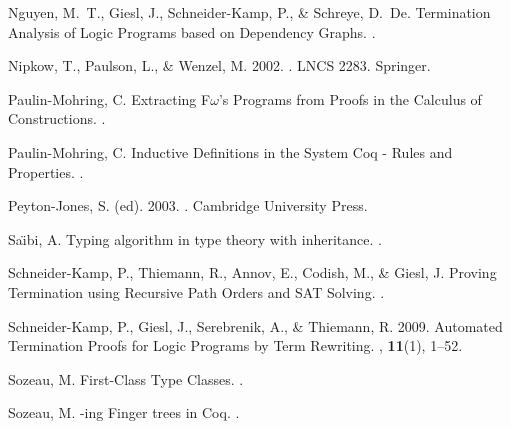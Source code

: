 \begin{thebibliography}{}
Nguyen, M.~T., Giesl, J., Schneider-Kamp, P., \& Schreye, D.~De.
\newblock Termination Analysis of Logic Programs based on Dependency Graphs.
.

Nipkow, T., Paulson, L., \& Wenzel, M. 2002.
.
\newblock LNCS 2283.
\newblock Springer.


Paulin-Mohring, C.
\newblock Extracting {F}$\omega$'s Programs from Proofs in the Calculus of
  Constructions.
.

Paulin-Mohring, C.
\newblock Inductive Definitions in the System {Coq} - Rules and Properties.
.

Peyton-Jones, S. (ed). 2003.
.
\newblock Cambridge University Press.

Sa{\"\i}bi, A.
\newblock Typing algorithm in type theory with inheritance.
.

Schneider-Kamp, P., Thiemann, R., Annov, E., Codish, M., \& Giesl, J.
\newblock Proving Termination using Recursive Path Orders and {SAT} Solving.
.

Schneider-Kamp, P., Giesl, J., Serebrenik, A., \& Thiemann, R. 2009.
\newblock Automated Termination Proofs for Logic Programs by Term Rewriting.
, {\bf 11}(1), 1--52.

Sozeau, M.
\newblock First-Class Type Classes.
.

Sozeau, M.
-ing Finger trees in {Coq}.
.


\end{thebibliography}
